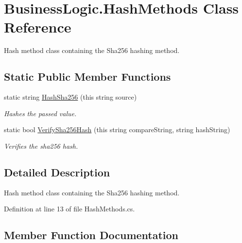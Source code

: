 \hypertarget{class_business_logic_1_1_hash_methods}{}\section{Business\+Logic.\+Hash\+Methods Class Reference}
\label{class_business_logic_1_1_hash_methods}


Hash method class containing the Sha256 hashing method.  


\subsection*{Static Public Member Functions}
\begin{DoxyCompactItemize}
\item 
static string \hyperlink{class_business_logic_1_1_hash_methods_a8d882378500b661e39d7201d2b89aed2}{Hash\+Sha256} (this string source)
\begin{DoxyCompactList}\small\item\em Hashes the passed value. \end{DoxyCompactList}\item 
static bool \hyperlink{class_business_logic_1_1_hash_methods_a921c0dc701d7a46d7cbdb36e0409f025}{Verify\+Sha256\+Hash} (this string compare\+String, string hash\+String)
\begin{DoxyCompactList}\small\item\em Verifies the sha256 hash. \end{DoxyCompactList}\end{DoxyCompactItemize}


\subsection{Detailed Description}
Hash method class containing the Sha256 hashing method. 



Definition at line 13 of file Hash\+Methods.\+cs.



\subsection{Member Function Documentation}
